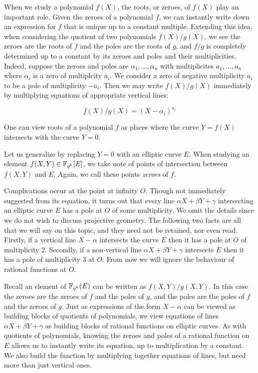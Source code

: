 When we study a polynomial $f(X)$, the roots, or zeroes,
of $f(X)$ play an important
role. Given the zeroes of a polynomial $f$, we can
instantly write down an expression for $f$ that is unique up to a constant
multiple.
Extending this idea, when considering the quotient of
two polynomials $f(X)/g(X)$, we see the zeroes are the roots of $f$ and
the poles are the roots of $g$, and $f/g$ is completely determined up
to a constant by its zeroes and poles and their multiplicities.
Indeed, suppose the zeroes and poles are $\alpha_1,...,\alpha_n$
with multiplicites $a_1,...,a_n$ where $\alpha_i$ is a zero of multiplcity
$a_i$. We consider a zero of negative multiplicity $a_i$ to be a pole
of multiplicity $-a_i$. Then we may write $f(X)/g(X)$ immediately
by multiplying equations of appropriate vertical lines:

\[ f(X)/g(X) = (X-\alpha_i)^{a_i} \]

One can view roots of a polynomial $f$
as places where the curve $Y = f(X)$
intersects with the curve $Y = 0$.

Let us generalize by replacing $Y=0$ with an elliptic curve $E$.
When studying an element $f(X,Y) \in \mathbb{F}_{q^k}[E]$, we take note of points of
intersection between $f(X,Y)$ and $E$.
Again, we call these points \emph{zeroes} of $f$.

Complications occur at the point at infinity $O$. Though not immediately
suggested from its equation, it turns out that every line
$\alpha X + \beta Y + \gamma$
intersecting an elliptic curve $E$ has a pole
at $O$ of some multiplicity. We omit the details since we do not wish to
discuss projective geometry. The following two facts are all that we will say
on this topic, and they need not be retained, nor even read. Firstly, if
a vertical line $X-\alpha$ intersects the curve $E$ then it has a pole
at $O$ of multiplicity 2. Secondly, if a non-vertical line $\alpha X + \beta Y
+ \gamma$ intersects $E$ then it has a pole of multiplicity 3 at $O$.
From now we will ignore the behaviour of rational functions at $O$.

Recall an element of $\mathbb{F}_{q^k}(E)$ can be written as $f(X,Y)/g(X,Y)$.
In this case the zeroes are the zeroes of $f$ and the poles of $g$,
and the poles are the poles of $f$ and the zeroes of $g$.
Just as expressions of the form $X-\alpha$ can be viewed as building blocks of
quotients of polynomials, we view equations of lines
$\alpha X + \beta Y + \gamma$ as building blocks of rational functions
on elliptic curves.
As with quotients of polynomials, knowing the zeroes and poles of
a rational function on $E$ allows us to instantly write its equation,
up to multiplication by a constant. We also build the function by
multiplying together equations of lines, but need more than just
vertical ones.

